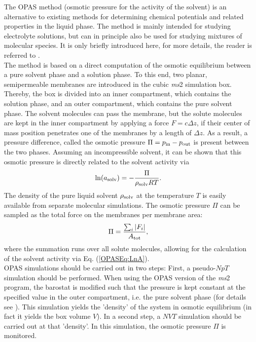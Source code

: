The OPAS method (osmotic pressure for the activity of the solvent) is an alternative to existing methods for determining chemical potentials and related properties in the liquid phase. The method is mainly intended for studying electrolyte solutions, but can in principle also be used for studying mixtures of molecular species. It is only briefly introduced here, for more details, the reader is referred to \parencite{kohns2016}.\\
The method is based on a direct computation of the osmotic equilibrium between a pure solvent phase and a solution phase. To this end, two planar, semipermeable membranes are introduced in the cubic \emph{ms}2 simulation box. Thereby, the box is divided into an inner compartment, which contains the solution phase, and an outer compartment, which contains the pure solvent phase. The solvent molecules can pass the membrane, but the solute molecules are kept in the inner compartment by applying a force $F=c\Delta z$, if their center of mass position penetrates one of the membranes by a length of $\Delta z$. As a result, a pressure difference, called the osmotic pressure $\Pi=p_{\rm in}-p_{\rm out}$ is present between the two phases. Assuming an incompressible solvent, it can be shown that this osmotic pressure is directly related to the solvent activity via
\begin{equation}
\ln(a_{\rm solv})=-\frac{\Pi}{\rho_{\rm solv}RT}.
\label{OPASEq:LnA}
\end{equation}
The density of the pure liquid solvent $\rho_{\rm solv}$ at the temperature $T$ is easily available from separate molecular simulations. The osmotic pressure $\Pi$ can be sampled as the total force on the membranes per membrane area:
\begin{equation}
\Pi=\frac{\sum_{i}^{}|F_{i}|}{A_{\rm tot}},
\end{equation}
where the summation runs over all solute molecules, allowing for the calculation of the solvent activity via Eq. (\ref{OPASEq:LnA}).\\
OPAS simulations should be carried out in two steps: First, a pseudo-$NpT$ simulation should be performed. When using the OPAS version of the \emph{ms}2 program, the barostat is modified such that the pressure is kept constant at the specified value in the outer compartment, i.e. the pure solvent phase (for details see \parencite{kohns2016}). This simulation yields the 'density' of the system in osmotic equilibrium (in fact it yields the box volume $V$). In a second step, a $NVT$ simulation should be carried out at that 'density'. In this simulation, the osmotic pressure $\Pi$ is monitored.\\
